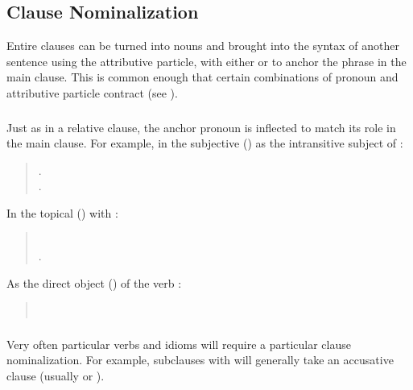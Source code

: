\subsection{Clause Nominalization} Entire clauses can be turned into
nouns and brought into the syntax of another sentence using the
attributive particle, with either  or  to anchor the
phrase in the main clause.  This is common enough that certain
combinations of pronoun and attributive particle contract (see
). \label{syn:clause-nom}

\subsubsection{} Just as in a relative clause, the anchor pronoun is
inflected to match its role in the main clause.  For example, in the
subjective () as the intransitive subject of :

\begin{quotation}
\noindent{}.\\
\indent{}.
\end{quotation}

\noindent In the topical () with :
\begin{quotation}
\noindent{}\\
\indent{}.
\end{quotation}

\noindent As the direct object () of the verb :
\begin{quotation}
\noindent{}\\
\indent{}
\end{quotation}

\subsubsection{} Very often particular verbs and idioms will require a
particular clause nominalization.  For example, subclauses with
  will generally take an accusative clause (usually
 or ).

